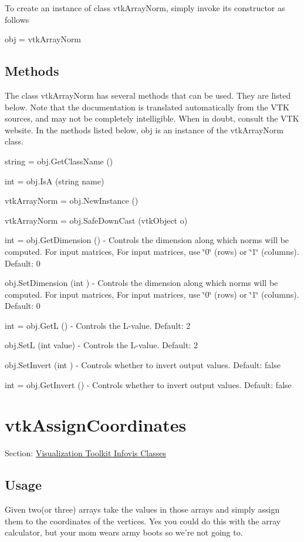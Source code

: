 To create an instance of class vtk\-Array\-Norm, simply invoke its constructor as follows \begin{DoxyVerb}  obj = vtkArrayNorm
\end{DoxyVerb}
 \hypertarget{vtkwidgets_vtkxyplotwidget_Methods}{}\subsection{Methods}\label{vtkwidgets_vtkxyplotwidget_Methods}
The class vtk\-Array\-Norm has several methods that can be used. They are listed below. Note that the documentation is translated automatically from the V\-T\-K sources, and may not be completely intelligible. When in doubt, consult the V\-T\-K website. In the methods listed below, {\ttfamily obj} is an instance of the vtk\-Array\-Norm class. 
\begin{DoxyItemize}
\item {\ttfamily string = obj.\-Get\-Class\-Name ()}  
\item {\ttfamily int = obj.\-Is\-A (string name)}  
\item {\ttfamily vtk\-Array\-Norm = obj.\-New\-Instance ()}  
\item {\ttfamily vtk\-Array\-Norm = obj.\-Safe\-Down\-Cast (vtk\-Object o)}  
\item {\ttfamily int = obj.\-Get\-Dimension ()} -\/ Controls the dimension along which norms will be computed. For input matrices, For input matrices, use \char`\"{}0\char`\"{} (rows) or \char`\"{}1\char`\"{} (columns). Default\-: 0  
\item {\ttfamily obj.\-Set\-Dimension (int )} -\/ Controls the dimension along which norms will be computed. For input matrices, For input matrices, use \char`\"{}0\char`\"{} (rows) or \char`\"{}1\char`\"{} (columns). Default\-: 0  
\item {\ttfamily int = obj.\-Get\-L ()} -\/ Controls the L-\/value. Default\-: 2  
\item {\ttfamily obj.\-Set\-L (int value)} -\/ Controls the L-\/value. Default\-: 2  
\item {\ttfamily obj.\-Set\-Invert (int )} -\/ Controls whether to invert output values. Default\-: false  
\item {\ttfamily int = obj.\-Get\-Invert ()} -\/ Controls whether to invert output values. Default\-: false  
\end{DoxyItemize}\hypertarget{vtkinfovis_vtkassigncoordinates}{}\section{vtk\-Assign\-Coordinates}\label{vtkinfovis_vtkassigncoordinates}
Section\-: \hyperlink{sec_vtkinfovis}{Visualization Toolkit Infovis Classes} \hypertarget{vtkwidgets_vtkxyplotwidget_Usage}{}\subsection{Usage}\label{vtkwidgets_vtkxyplotwidget_Usage}
Given two(or three) arrays take the values in those arrays and simply assign them to the coordinates of the vertices. Yes you could do this with the array calculator, but your mom wears army boots so we're not going to.

